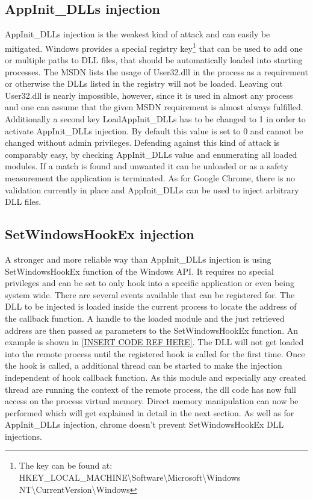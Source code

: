 \subsection{AppInit\_DLLs injection}
AppInit\_DLLs injection is the weakest kind of attack and can easily be mitigated. Windows provides a special registry key\footnote{The key can be found at: HKEY\_LOCAL\_MACHINE\textbackslash Software\textbackslash Microsoft\textbackslash Windows NT\textbackslash CurrentVersion\textbackslash Windows} that can be used to add one or multiple paths to DLL files, that should be automatically loaded into starting processes. The MSDN\cite{msdn_appinitdlls} lists the usage of User32.dll in the process as a requirement or otherwise the DLLs listed in the registry will not be loaded. Leaving out User32.dll is nearly impossible, however, since it is used in almost any process and one can assume that the given MSDN requirement is almost always fulfilled. Additionally a second key LoadAppInit\_DLLs has to be changed to 1 in order to activate AppInit\_DLLs injection. By default this value is set to 0 and cannot be changed without admin privileges. Defending against this kind of attack is comparably easy, by checking AppInit\_DLLs value and enumerating all loaded modules. If a match is found and unwanted it can be unloaded or as a safety measurement the application is terminated. As for Google Chrome, there is no validation currently in place and AppInit\_DLLs can be used to inject arbitrary DLL files.

\subsection{SetWindowsHookEx injection}
A stronger and more reliable way than AppInit\_DLLs injection is using SetWindowsHookEx function of the Windows API. It requires no special privileges and can be set to only hook into a specific application or even being system wide. There are several events available that can be registered for. The DLL to be injected is loaded inside the current process to locate the address of the callback function. A handle to the loaded module and the just retrieved address are then passed as parameters to the SetWindowsHookEx function. An example is shown in \ref{INSERT CODE REF HERE}. The DLL will not get loaded into the remote process until the registered hook is called for the first time. Once the hook is called, a additional thread can be started to make the injection independent of hook callback function. As this module and especially any created thread are running the context of the remote process, the dll code has now full access on the process virtual memory. Direct memory manipulation can now be performed which will get explained in detail in the next section. As well as for AppInit\_DLLs injection, chrome doesn't prevent SetWindowsHookEx DLL injections.

